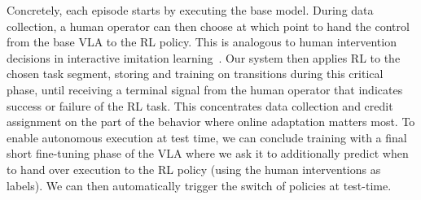 Concretely, each episode starts by executing the base model. During data collection, a human operator can then choose at which point to hand the control from the base VLA to the RL policy. This is analogous to human intervention decisions in interactive imitation learning~\citep{kelly2019hgdaggerinteractiveimitationlearning}. Our system then applies RL to the chosen task segment, storing and training on transitions during this critical phase, until receiving a terminal signal from the human operator that indicates success or failure of the RL task. This concentrates data collection and credit assignment on the part of the behavior where online adaptation matters most. 
To enable autonomous execution at test time, we can conclude training with a final short fine-tuning phase of the VLA where we ask it to additionally predict when to hand over execution to the RL policy (using the human interventions as labels). We can then automatically trigger the switch of policies at test-time.
